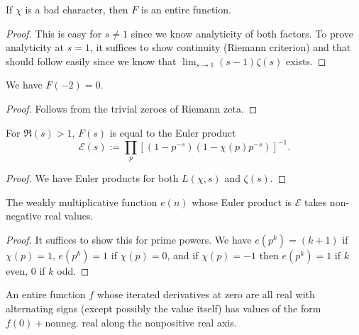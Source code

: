 \begin{lemma} \label{F_entire}
  \leanok
  If $\chi$ is a bad character, then $F$ is an entire function.
\end{lemma}

\begin{proof}
  \leanok
  This is easy for $s \ne 1$ since we know analyticity of both factors. To prove analyticity at $s = 1$, it suffices to show continuity (Riemann criterion) and that should follow easily since we know that $\lim_{s \to 1} (s - 1) \zeta(s)$ exists.
\end{proof}

\begin{lemma}
 \label{zero_of_F}
 \leanok
 We have $F(-2) = 0$.
\end{lemma}

\begin{proof}
 \leanok
 Follows from the trivial zeroes of Riemann zeta.
\end{proof}

\begin{lemma} \label{F_Euler_product}
  For $\Re(s) > 1$, $F(s)$ is equal to the Euler product
  \[ \mathcal{E}(s) := \prod_p \left[ (1 - p^{-s}) (1 - \chi(p) p^{-s})\right]^{-1}. \]
\end{lemma}

\begin{proof}
  We have Euler products for both $L(\chi, s)$ and $\zeta(s)$.
\end{proof}

\begin{lemma} \label{nonneg_coeffs}
  The weakly multiplicative function $e(n)$ whose Euler product is $\mathcal{E}$ takes non-negative real values.
\end{lemma}

\begin{proof}
  It suffices to show this for prime powers. We have $e(p^k) = (k + 1)$ if $\chi(p) = 1$, $e(p^k) = 1$ if $\chi(p) = 0$, and if $\chi(p) = -1$ then $e(p^k) = 1$ if $k$ even, $0$ if $k$ odd.
\end{proof}

\begin{lemma} \label{positivity_from_derivs}
  \leanok
  An entire function $f$ whose iterated derivatives at zero are all real with alternating signs
  (except possibly the value itself) has values of the form $f(0) + \text{nonneg. real}$
  along the nonpositive real axis.
\end{lemma}

